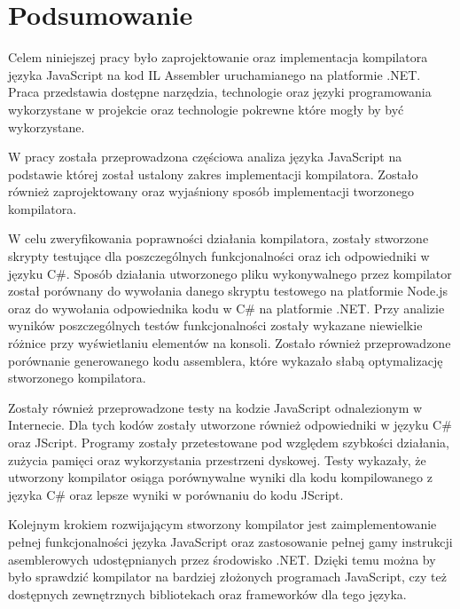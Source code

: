 %


\chapter*{Podsumowanie}

\par Celem niniejszej pracy było zaprojektowanie oraz implementacja kompilatora języka JavaScript na kod IL Assembler uruchamianego na platformie .NET. Praca przedstawia dostępne narzędzia, technologie oraz języki programowania wykorzystane w projekcie oraz technologie pokrewne które mogły by być wykorzystane.
\par W pracy została przeprowadzona częściowa analiza języka JavaScript na podstawie której został ustalony zakres implementacji kompilatora. Zostało również zaprojektowany oraz wyjaśniony sposób implementacji tworzonego kompilatora.
\par W celu zweryfikowania poprawności działania kompilatora, zostały stworzone skrypty testujące dla poszczególnych funkcjonalności oraz ich odpowiedniki w języku C\#. Sposób działania utworzonego pliku wykonywalnego przez kompilator został porównany do wywołania danego skryptu testowego na platformie Node.js oraz do wywołania odpowiednika kodu w C\# na platformie .NET. Przy analizie wyników poszczególnych testów funkcjonalności zostały wykazane niewielkie różnice przy wyświetlaniu elementów na konsoli. Zostało również przeprowadzone porównanie generowanego kodu assemblera, które wykazało słabą optymalizację stworzonego kompilatora.
\par Zostały również przeprowadzone testy na kodzie JavaScript odnalezionym w Internecie. Dla tych kodów zostały utworzone również odpowiedniki w języku C\# oraz JScript. Programy zostały przetestowane pod względem szybkości działania, zużycia pamięci oraz wykorzystania przestrzeni dyskowej. Testy wykazały, że utworzony kompilator osiąga porównywalne wyniki dla kodu kompilowanego z języka C\# oraz lepsze wyniki w porównaniu do kodu JScript.
\par Kolejnym krokiem rozwijającym stworzony kompilator jest zaimplementowanie pełnej funkcjonalności języka JavaScript oraz zastosowanie pełnej gamy instrukcji asemblerowych udostępnianych przez środowisko .NET. Dzięki temu można by było sprawdzić kompilator na bardziej złożonych programach JavaScript, czy też dostępnych zewnętrznych bibliotekach oraz frameworków dla tego języka.

